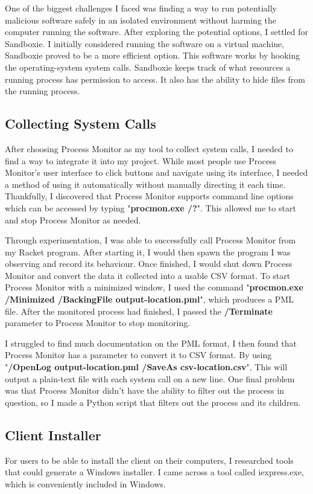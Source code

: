 One of the biggest challenges I faced was finding a way to
run potentially malicious software safely
in an isolated environment without harming the
computer running the software.
After exploring the potential options,
I settled for Sandboxie. \cite{sandboxie}
I initially considered running the software on a virtual machine,
Sandboxie proved to be a more efficient option.
This software works by hooking the operating-system system calls.
Sandboxie keeps track of what resources a running
process has permission to access.
It also has the ability to hide files from the running process.

\subsection{Collecting System Calls}
After choosing Process Monitor as my tool to collect system calls,
I needed to find a way to integrate it into my project.
While most people use Process Monitor's user interface
to click buttons and navigate using its interface,
I needed a method of using it automatically
without manually directing it each time.
Thankfully, I discovered that Process Monitor supports command line
options which can be accessed by typing "\textbf{procmon.exe /?}".
This allowed me to start and stop Process Monitor as needed.

Through experimentation, I was able to successfully call
Process Monitor from my Racket program. After starting it,
I would then spawn the program I was observing and record its behaviour.
Once finished, I would shut down Process Monitor
and convert the data it collected into a usable CSV format.
To start Process Monitor with a minimized window,
I used the command
"\textbf{procmon.exe /Minimized /BackingFile output-location.pml}",
which produces a PML file. After the monitored process had finished,
I passed the
\textbf{/Terminate} parameter to Process Monitor to stop monitoring.

I struggled to find much documentation on the PML format,
I then found that Process Monitor has a parameter to convert it to CSV format.
By using "\textbf{/OpenLog output-location.pml /SaveAs csv-location.csv}",
This will output a plain-text file with each system call on a new line.
One final problem was that Process Monitor didn't have the ability
to filter out the process in question,
so I made a Python script that filters out the process and its children.

\subsection{Client Installer}
For users to be able to install the client on their computers,
I researched tools that could generate a Windows installer.
I came across a tool called iexpress.exe,
which is conveniently included in Windows.


